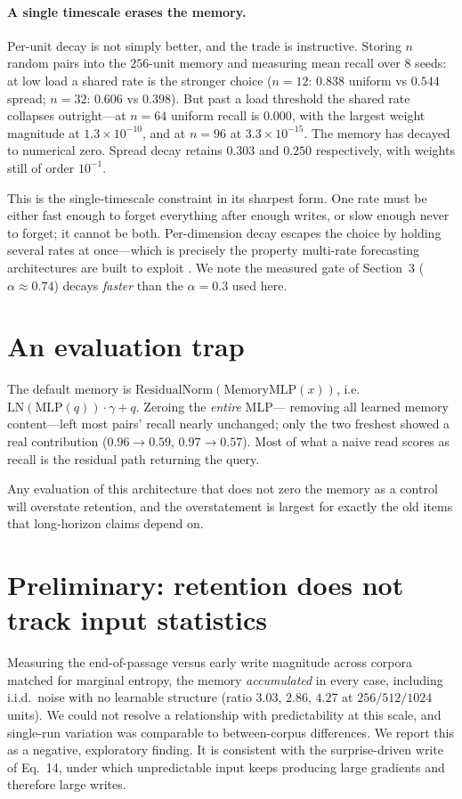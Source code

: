 \documentclass{article}
\begin{document}
\paragraph{A single timescale erases the memory.} Per-unit decay is not simply
better, and the trade is instructive. Storing $n$ random pairs into the $256$-unit
memory and measuring mean recall over $8$ seeds: at low load a shared rate is the
stronger choice ($n{=}12$: $0.838$ uniform vs $0.544$ spread; $n{=}32$: $0.606$ vs
$0.398$). But past a load threshold the shared rate collapses outright---at
$n{=}64$ uniform recall is $0.000$, with the largest weight magnitude at
$1.3\times10^{-10}$, and at $n{=}96$ at $3.3\times10^{-15}$. The memory has
decayed to numerical zero. Spread decay retains $0.303$ and $0.250$ respectively,
with weights still of order $10^{-1}$.

This is the single-timescale constraint in its sharpest form. One rate must be
either fast enough to forget everything after enough writes, or slow enough never
to forget; it cannot be both. Per-dimension decay escapes the choice by holding
several rates at once---which is precisely the property multi-rate forecasting
architectures are built to exploit \citep{challu2023nhits}. We note the measured
gate of Section~3 ($\alpha\approx0.74$) decays \emph{faster} than the $\alpha{=}0.3$
used here.

\section{An evaluation trap}

The default memory is $\mathrm{ResidualNorm}(\mathrm{MemoryMLP}(x))$, i.e.
$\mathrm{LN}(\mathrm{MLP}(q))\cdot\gamma + q$. Zeroing the \emph{entire} MLP---
removing all learned memory content---left most pairs' recall nearly unchanged;
only the two freshest showed a real contribution ($0.96\to0.59$,
$0.97\to0.57$). Most of what a naive read scores as recall is the residual path
returning the query.

Any evaluation of this architecture that does not zero the memory as a control
will overstate retention, and the overstatement is largest for exactly the old
items that long-horizon claims depend on.

\section{Preliminary: retention does not track input statistics}

Measuring the end-of-passage versus early write magnitude across corpora matched
for marginal entropy, the memory \emph{accumulated} in every case, including
i.i.d.\ noise with no learnable structure (ratio $3.03$, $2.86$, $4.27$ at
$256/512/1024$ units). We could not resolve a relationship with predictability
at this scale, and single-run variation was comparable to between-corpus
differences. We report this as a negative, exploratory finding. It is consistent
with the surprise-driven write of Eq.~14, under which unpredictable input keeps
producing large gradients and therefore large writes.
\end{document}
